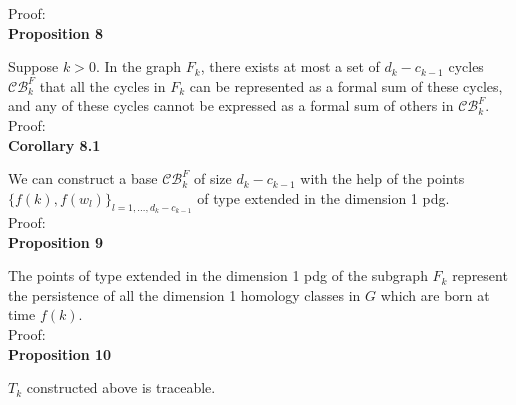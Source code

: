 \documentclass[a4paper,12pt]{article}
\numberwithin{equation}{section}
\begin{document}
	\noindent Proof:\\
	
	\noindent \textbf{Proposition 8}
	
	Suppose $k>0$. In the graph $F_k$, there exists at most a set of $d_k - c_{k-1}$ cycles $\mathcal{CB}^{F}_k$ that all the cycles in $F_k$ can be represented as a formal sum of these cycles, and any of these cycles cannot be expressed as a formal sum of others in $\mathcal{CB}^F_k$.\\
	
	\noindent Proof:\\
	
	\noindent \textbf{Corollary 8.1}
	
	We can construct a base $\mathcal{CB}^F_k$ of size $d_k - c_{k-1}$ with the help of the points $\{f(k), f(w_l)\}_{l =1,\ldots,d_k - c_{k-1}}$ of type extended in the dimension 1 pdg.\\
	
	\noindent Proof: \\
	
	\noindent \textbf{Proposition 9}
	
	The points of type extended in the dimension 1 pdg of the subgraph $F_k$ represent the persistence of all the dimension 1 homology classes in $G$ which are born at time $f(k)$. \\
	
	\noindent Proof:\\
	
	
	
	\noindent \textbf{Proposition 10}
	
	$T_k$ constructed above is traceable.
	
	
	
	
	


	
\end{document}
